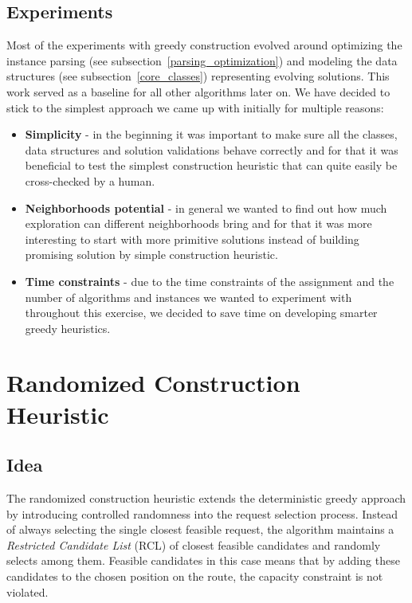\documentclass[a4paper]{scrartcl}
\begin{document}
\subsection{Experiments}
Most of the experiments with greedy construction evolved around optimizing the instance parsing (see subsection~\ref{parsing_optimization}) and modeling the data structures (see subsection~\ref{core_classes}) representing evolving solutions. This work served as a baseline for all other algorithms later on. We have decided to stick to the simplest approach we came up with initially for multiple reasons:
\begin{itemize}
    \item \textbf{Simplicity} - in the beginning it was important to make sure all the classes, data structures and solution validations behave correctly and for that it was beneficial to test the simplest construction heuristic that can quite easily be cross-checked by a human.
    \item \textbf{Neighborhoods potential} - in general we wanted to find out how much exploration can different neighborhoods bring and for that it was more interesting to start with more primitive solutions instead of building promising solution by simple construction heuristic.
    \item \textbf{Time constraints} - due to the time constraints of the assignment and the number of algorithms and instances we wanted to experiment with throughout this exercise, we decided to save time on developing smarter greedy heuristics.
\end{itemize}

\section{Randomized Construction Heuristic}
\subsection{Idea}
The randomized construction heuristic extends the deterministic greedy approach by introducing controlled randomness into the request selection process. Instead of always selecting the single closest feasible request, the algorithm maintains a \emph{Restricted Candidate List} (RCL) of closest feasible candidates and randomly selects among them. Feasible candidates in this case means that by adding these candidates to the chosen position on the route, the capacity constraint is not violated.
\end{document}
